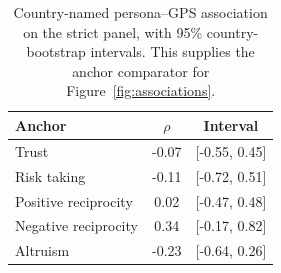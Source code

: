 \begin{table}[htbp]\centering\small
\caption{Country-named persona--GPS association on the strict panel, with 95\% country-bootstrap intervals. This supplies the anchor comparator for Figure~\ref{fig:associations}.}\label{tab:persona}
\begin{tabular}{lcc}\toprule Anchor & $\rho$ & Interval\\\midrule
Trust & -0.07 & [-0.55, 0.45] \\
Risk taking & -0.11 & [-0.72, 0.51] \\
Positive reciprocity & 0.02 & [-0.47, 0.48] \\
Negative reciprocity & 0.34 & [-0.17, 0.82] \\
Altruism & -0.23 & [-0.64, 0.26] \\
\bottomrule
\end{tabular}\end{table}
